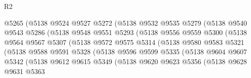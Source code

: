 \begin{lexlean}{R2}
\begin{coremodule}
                          @5265
                          (@5138
                            @9524
                            @9527
                            @5272
                            (@5138
                              @9532
                              @9535
                              @5279
                              (@5138
                                @9540
                                @9543
                                @5286
                                (@5138
                                  @9548
                                  @9551
                                  @5293
                                  (@5138
                                    @9556
                                    @9559
                                    @5300
                                    (@5138
                                      @9564
                                      @9567
                                      @5307
                                      (@5138
                                        @9572
                                        @9575
                                        @5314
                                        (@5138
                                          @9580
                                          @9583
                                          @5321
                                          (@5138
                                            @9588
                                            @9591
                                            @5328
                                            (@5138
                                              @9596
                                              @9599
                                              @5335
                                              (@5138
                                                @9604
                                                @9607
                                                @5342
                                                (@5138
                                                  @9612
                                                  @9615
                                                  @5349
                                                  (@5138
                                                    @9620
                                                    @9623
                                                    @5356
                                                    (@5138
                                                      @9628
                                                      @9631
                                                      @5363

\end{coremodule}
\end{lexlean}
